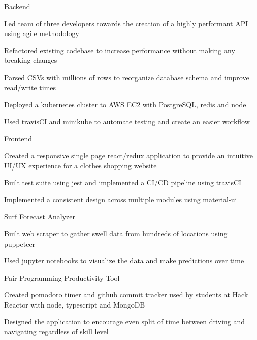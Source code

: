
\begin{cventries}
  \cventry
    {} %
    {Backend} %
    {} %
    {} %
    {
      \begin{cvitems} %
        \item {Led team of three developers towards the creation of a highly performant API using agile methodology}
        \item {Refactored existing codebase to increase performance without making any breaking changes}
		\item {Parsed CSVs with millions of rows to reorganize database schema and improve read/write times}
		\item {Deployed a kubernetes cluster to AWS EC2 with PostgreSQL, redis and node}
		\item {Used travisCI and minikube to automate testing and create an easier workflow}
      \end{cvitems}
    }
  
  \cventry
    {} %
    {Frontend} %
    {} %
    {} %
    {
      \begin{cvitems} %
		\item {Created a responsive single page react/redux application to provide an intuitive UI/UX experience for a clothes shopping website}
		\item {Built test suite using jest and implemented a CI/CD pipeline using travisCI}
		\item {Implemented a consistent design across multiple modules using material-ui}
      \end{cvitems}
    }

  \cventry
    {} %
    {Surf Forecast Analyzer} %
    {} %
    {} %
    {
      \begin{cvitems} %
      	\item {Built web scraper to gather swell data from hundreds of locations using puppeteer}
		\item {Used jupyter notebooks to visualize the data and make predictions over time}
      \end{cvitems}
    }
    
  \cventry
    {} %
    {Pair Programming Productivity Tool} %
    {} %
    {} %
    {
      \begin{cvitems} %
      	\item {Created pomodoro timer and github commit tracker used by students at Hack Reactor with node, typescript and MongoDB}
      	\item {Designed the application to encourage even split of time between driving and navigating regardless of skill level}
      \end{cvitems}
    }
\end{cventries}